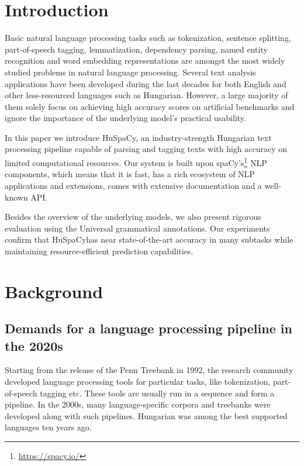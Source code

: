 \documentclass{llncs}
\newcommand{\spacy}{spaCy}
\newcommand{\huspacy}{HuSpaCy}
\begin{document}
\section{Introduction}

Basic natural language processing tasks such as tokenization, sentence splitting, part-of-speech tagging, lemmatization, dependency parsing, named entity recognition and word embedding representations are amongst the most widely studied problems in natural language processing. Several text analysis applications have been developed during the last decades for both English and other less-resourced languages such as Hungarian. However, a large majority of them solely focus on achieving high accuracy scores on artificial benchmarks and ignore the importance of the underlying model’s practical usability.


In this paper we introduce \huspacy, an industry-strength Hungarian text processing pipeline capable of parsing and tagging texts with high accuracy on limited computational resources. Our system is built upon \spacy’s\footnote{\url{https://spacy.io/}} NLP components, which means that it is fast, has a rich ecosystem of NLP applications and extensions, comes with extensive documentation and a well-known API. 

Besides the overview of the underlying models, we also  present rigorous evaluation using the Universal grammatical annotations. Our experiments confirm that \huspacy has near state-of-the-art accuracy in many subtasks while maintaining resource-efficient prediction capabilities.

\section{Background}

\subsection{Demands for a language processing pipeline in the 2020s}
Starting from the release of the Penn Treebank \citep{penntreebank} in 1992, the research community developed language processing tools for particular tasks, like tokenization, part-of-speech tagging etc. These tools are usually run in a sequence and form a pipeline. In the 2000s, many language-specific corpora and treebanks were developed along with such pipelines. Hungarian was among the best supported languages \citep{metanet} ten years ago.
\end{document}
